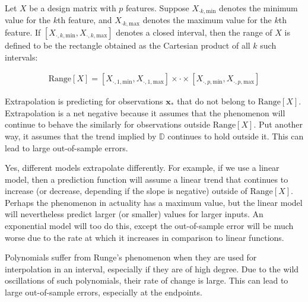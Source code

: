 \documentclass[12pt]{article}
\begin{document}

\begin{enumerate}


Let $X$ be a design matrix with $p$ features. Suppose $X_{\cdot k, \text{min}}$
denotes the minimum value for the $k$th feature, and $X_{\cdot k, \text{max}}$
denotes the maximum value for the $k$th feature. If
$[X_{\cdot, k, \text{min}}, X_{\cdot, k, \text{max}}]$ denotes a closed interval,
then the range of $X$ is defined to be the rectangle obtained as the Cartesian product
of all $k$ such intervals:

\begin{align*}
	\text{Range}[X]
	= [X_{\cdot,1, \text{min}}, X_{\cdot, 1, \text{max}}] 
	\times \cdot \times
	[X_{\cdot,p, \text{min}}, X_{\cdot, p, \text{max}}]
\end{align*}

Extrapolation is predicting for observations $\bm{x}_*$ that do not belong
to $\text{Range}[X]$. Extrapolation is a net negative because it assumes
that the phenomenon will continue to behave the similarly for observations
outside $\text{Range}[X]$. Put another way, it assumes that the trend
implied by $\mathbb{D}$ continues to hold outside it. This can lead to
large out-of-sample errors.


Yes, different models extrapolate differently. For example, if we use
a linear model, then a prediction function will assume a linear trend that
continues to increase (or decrease, depending if the slope is negative)
outside of $\text{Range}[X]$. Perhaps the phenomenon in actuality has a maximum
value, but the linear model will nevertheless predict larger (or smaller) values
for larger inputs. An exponential model will too do this, except the out-of-sample
error will be much worse due to the rate at which it increases in comparison to
linear functions.


Polynomials suffer from Runge's phenomenon when they are used for interpolation
in an interval, especially if they are of high degree. Due to the wild oscillations
of such polynomials, their rate of change is large. This can lead to large out-of-sample
errors, especially at the endpoints.

\end{enumerate}
\end{document}

